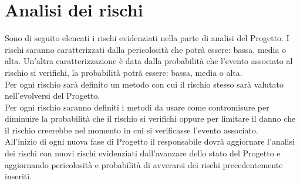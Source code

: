 \section{Analisi dei rischi}{
Sono di seguito elencati i rischi evidenziati nella parte di analisi del Progetto. 
I rischi saranno caratterizzati dalla pericolosità che potrà essere: bassa, media o alta.
Un'altra caratterizzazione è data dalla probabilità che l'evento associato al rischio si verifichi, la probabilità potrà essere: bassa, media o alta.\\
Per ogni rischio sarà definito un metodo con cui il rischio stesso sarà valutato nell'evolversi del Progetto.\\
Per ogni rischio saranno definiti i metodi da usare come contromisure per diminuire la probabilità che il rischio si verifichi oppure per limitare il danno che il rischio creerebbe nel momento in cui si verificasse l'evento associato.\\
All'inizio di ogni nuova fase di Progetto il responsabile dovrà aggiornare l'analisi dei rischi con nuovi rischi evidenziati dall'avanzare dello stato del Progetto e aggiornando pericolosità e probabilità di avverarsi dei rischi precedentemente inseriti.

}
